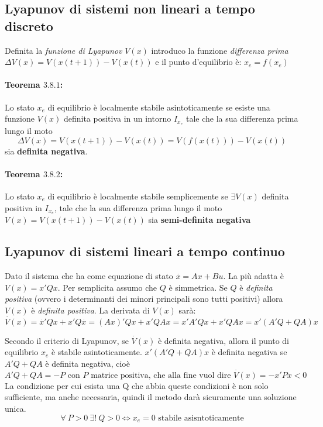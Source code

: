 \documentclass{article}
\begin{document}
\subsection{Lyapunov di sistemi non lineari a tempo discreto}
Definita la \textit{funzione di Lyapunov} $V(x)$ introduco la  funzione 
\textit{differenza prima} $\Delta V(x) = V(x(t+1))-V(x(t))$ e il punto d'equilibrio è:
$x_e = f(x_e)$
\paragraph{Teorema $3.8.1$:} Lo stato $x_e$ di equilibrio è localmente stabile asintoticamente se esiste una
funzione $V(x)$ definita positiva in un intorno $I_{x_e}$ tale che la sua differenza prima lungo il moto 
\[ \Delta V(x) = V(x(t+1))-V(x(t)) = V(f(x(t)))-V(x(t)) \] sia \textbf{definita negativa}.

\paragraph{Teorema $3.8.2$:}Lo stato $x_e$ di equilibrio è localmente stabile semplicemente se $\exists V(x)$ definita
positiva in $I_{x_e}$, tale che la sua differenza prima lungo il moto  $V(x) = V(x(t+1))-V(x(t))$ sia 
\textbf{semi-definita negativa}

\subsection{Lyapunov di sistemi  lineari a tempo continuo}
Dato il sistema che ha come equazione di stato \(\displaystyle \overset{\cdot}{x} = Ax+Bu \).
La più adatta è $V(x) = x'Qx$.
Per semplicita assumo che $Q$ è simmetrica.
Se $Q$ è {\color{blue} \textit{definita positiva}} (ovvero i determinanti dei minori principali sono tutti positivi) allora
$V(x)$ è {\color{blue} \textit{definita positiva}}.
La derivata di $V(x)$ sarà:
\[ \overset{\cdot}{V}(x) = \overset{\cdot}{x} ' Qx + x' Q\overset{\cdot}{x} = (Ax)' Qx + x' QAx = x' A' Qx + x' QAx = x' (A' Q + QA)x\]

Secondo il criterio di Lyapunov, se $\overset{\cdot}{V}(x)$ è definita negativa, allora il punto di equilibrio $x_e$
è stabile asintoticamente.
$x' (A' Q + QA)x$ è definita negativa se $A'Q + QA$ è definita negativa, cioè  
\[
    A'Q + QA = -P \text{ con $P$ matrice positiva, che alla fine vuol dire } \overset{\cdot}{V}(x) = -x'Px <0
\]
La condizione per cui esista una Q che abbia queste condizioni è non solo
sufficiente, ma anche necessaria, quindi il metodo darà sicuramente una soluzione unica.
\[ \forall\ P > 0 \ \exists!\ Q>0 \Longleftrightarrow x_e = 0 \text{ stabile asisntoticamente}\]
\end{document}
